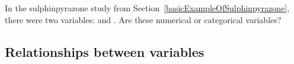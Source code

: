 \begin{exercise}
In the sulphinpyrazone study  from Section~\ref{basicExampleOfSulphinpyrazone}, there were two variables:  and . Are these numerical or categorical variables?
\end{exercise}




\subsection{Relationships between variables}
\label{variableRelations}


